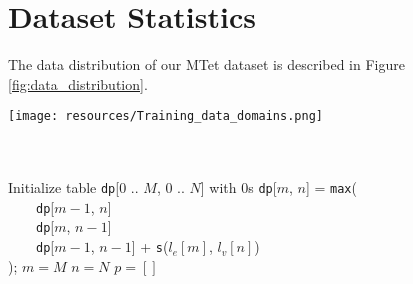 \documentclass[11pt]{article}
\begin{document}
\appendix

\section{Dataset Statistics}

The data distribution of our MTet dataset is described in Figure 
\ref{fig:data_distribution}.


\begin{figure*}[ht!]
    \centering
    \texttt{[image: resources/Training\_data\_domains.png]}

    \caption{Training data distribution across multiple domains}
    \label{fig:data_distribution}
\end{figure*}

\begin{algorithm}[tb!]
\small
\caption{Alignment algorithm for weakly-aligned pairs of documents. The algorithm strips away a portion of sentences in each document and matches the remaining sentences into pairs, aiming to maximize the total BLEU score with respect to a given translation model.}\label{alg:three}
\label{alg:dp}
\hrulefill\\
\hrulefill \\
 Initialize table \texttt{dp}[0 .. $M$, 0 .. $N$] with $0$s\;
  {
     {
    \texttt{dp}[$m$, $n$] = \texttt{max}(  \\
    \ \ \ \ \texttt{dp}[$m-1$, $n$]  \\
    \ \ \ \ \texttt{dp}[$m$, $n-1$] \\
    \ \ \ \ \texttt{dp}[$m-1$, $n-1$] + \texttt{s}($l_e[m]$, $l_v[n]$) \\ );
}}
 $m = M$\;
 $n = N$\;
 $p = []$\;
  {
 }
 \;
 \hrulefill
\end{algorithm}
\end{document}
